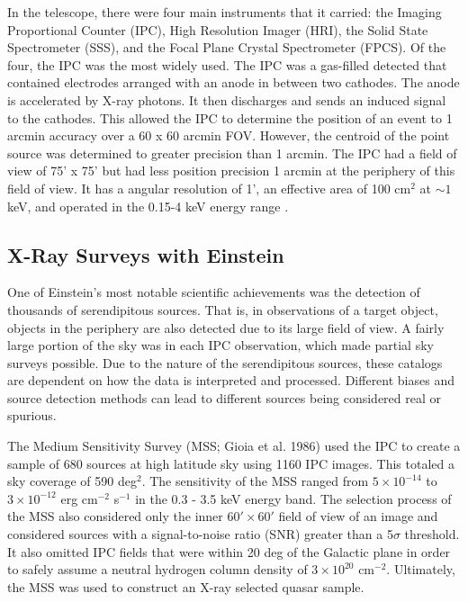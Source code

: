  In the telescope, there were four main instruments that it carried: the Imaging Proportional Counter (IPC), High Resolution Imager (HRI), the Solid State Spectrometer (SSS), and the Focal Plane Crystal Spectrometer (FPCS). 
 Of the four, the IPC was the most widely used. 
 The IPC was a gas-filled detected that contained electrodes arranged with an anode in between two cathodes. 
 The anode is accelerated by X-ray photons. 
 It then discharges and sends an induced signal to the cathodes. 
 This allowed the IPC to determine the position of an event to 1 arcmin accuracy over a 60 x 60 arcmin FOV. 
 However, the centroid of the point source was determined to greater precision than 1 arcmin. 
 The IPC had a field of view of 75’ x 75’ but had less position precision 1 arcmin at the periphery of this field of view.
 It has a angular resolution of 1’, an effective area of 100 cm$^2$ at $\sim 1$ keV, and operated in the 0.15-4 keV energy range \citep{giacconietal1979}.


 
 \subsection{X-Ray Surveys with Einstein}



One of Einstein’s most notable scientific achievements was the detection of thousands of serendipitous sources.
That is, in observations of a target object, objects in the periphery are also detected due to its large field of view.
A fairly large portion of the sky was in each IPC observation, which made partial sky surveys possible.
Due to the nature of the serendipitous sources, these catalogs are dependent on how the data is interpreted and processed.
Different biases and source detection methods can lead to different sources being considered real or spurious.

The Medium Sensitivity Survey (MSS; Gioia et al. 1986) used the IPC to create a sample of 680 sources at high latitude sky using 1160 IPC images. 
This totaled a sky coverage of 590 deg$^2$.
The sensitivity of the MSS ranged from $5\times 10^{-14}$ to $3\times 10^{-12}$ erg cm$^{-2}$ s$^{-1}$ in the 0.3 - 3.5 keV energy band.
The selection process of the MSS also considered only the inner $60' \times 60'$ field of view of an image and considered sources with a signal-to-noise ratio (SNR) greater than a 5$\sigma$ threshold.
It also omitted IPC fields that were within 20 deg of the Galactic plane in order to safely assume a neutral hydrogen column density of $3\times 10^{20}$ cm$^{-2}$. 
Ultimately, the MSS was used to construct an X-ray selected quasar sample.

